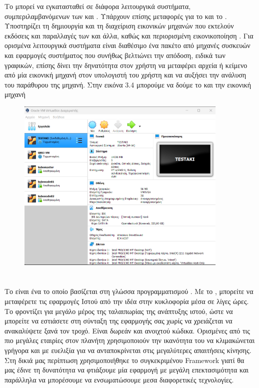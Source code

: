 Το  μπορεί να εγκατασταθεί σε διάφορα λειτουργικά συστήματα, συμπεριλαμβανόμενων των  και .
Υπάρχουν επίσης μεταφορές για το  και το .
Υποστηρίζει τη δημιουργία και τη διαχείριση εικονικών μηχανών που εκτελούν εκδόσεις και παραλλαγές των 
και άλλα, καθώς και περιορισμένη εικονικοποίηση .
Για ορισμένα λειτουργικά συστήματα είναι διαθέσιμο ένα πακέτο  από μηχανές συσκευών και εφαρμογές συστήματος
που συνήθως βελτιώνει την απόδοση, ειδικά των γραφικών, επίσης δίνει την δηνατότητα στον χρήστη να μεταφέρει αρχεία ή κείμενο από μία εικονική μηχανή στον υπολογιστή του χρήστη και να αυξήσει την ανάλυση του παράθυρου της μηχανή. 
Στην εικόνα 3.4 μπορούμε να δούμε το  και την εικονική μηχανή 

\begin{figure}[htb]
	\centering
	\includegraphics[width=0.9\textwidth]{graphics/virtualbox.PNG}
	\caption{ }
\end{figure}

\section{}

Το  είναι ένα  το οποίο βασίζεται στη γλώσσα προγραμματισμού . Με το , μπορείτε να μεταφέρετε τις εφαρμογές Ιστού από την ιδέα στην κυκλοφορία μέσα σε λίγες ώρες. Το  φροντίζει για μεγάλο μέρος
της ταλαιπωρίας της ανάπτυξης ιστού, ώστε να μπορείτε να εστιάσετε στη σύνταξη της εφαρμογής σας χωρίς να χρειάζεται να ανακαλύψετε ξανά τον τροχό.
Είναι δωρεάν και ανοιχτού κώδικα. Ορισμένες από τις πιο μεγάλες εταιρίες στον πλανήτη χρησιμοποιούν την ικανότητα του
να κλιμακώνεται γρήγορα και με ευελιξία για να ανταποκρίνεται στις μεγαλύτερες απαιτήσεις κίνησης. Στη δικιά μας περίπτωση χρησιμοποιήθηκε το συγκεκριμένου
{Framework} γιατί θα μας έδινε τη δυνατότητα να φτιάξουμε μία εφαρμογή με μεγάλη επεκτασιμότητα και παράλληλα να μπορέσουμε να ενσωματώσουμε μεσα διαφορετικές τεχνολογίες.

